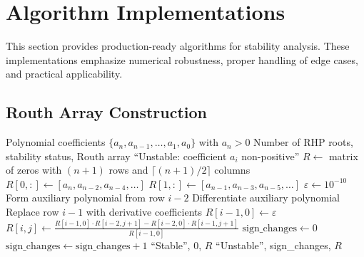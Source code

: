 \section{Algorithm Implementations}
\label{sec:stability_algorithms}

This section provides production-ready algorithms for stability analysis. These implementations emphasize numerical robustness, proper handling of edge cases, and practical applicability.

\subsection{Routh Array Construction}

\begin{algorithm}[H]
\caption{Routh-Hurwitz Stability Analysis}
\label{alg:routh}
\begin{algorithmic}[1]
\REQUIRE Polynomial coefficients $\{a_n, a_{n-1}, \ldots, a_1, a_0\}$ with $a_n > 0$
\ENSURE Number of RHP roots, stability status, Routh array
\STATE
\STATE {}
        \RETURN ``Unstable: coefficient $a_i$ non-positive''
    \ENDIF
\ENDFOR
\STATE
\STATE {}
\STATE $R \gets$ matrix of zeros with $(n+1)$ rows and $\lceil(n+1)/2\rceil$ columns
\STATE $R[0, :] \gets [a_n, a_{n-2}, a_{n-4}, \ldots]$ 
\STATE $R[1, :] \gets [a_{n-1}, a_{n-3}, a_{n-5}, \ldots]$ 
\STATE
\STATE {}
    \STATE $\varepsilon \gets 10^{-10}$ 
            \STATE {}
            \STATE Form auxiliary polynomial from row $i-2$
            \STATE Differentiate auxiliary polynomial
            \STATE Replace row $i-1$ with derivative coefficients
        \ELSE
            \STATE $R[i-1, 0] \gets \varepsilon$ 
        \ENDIF
    \ENDIF
        \STATE $R[i, j] \gets \frac{R[i-1, 0] \cdot R[i-2, j+1] - R[i-2, 0] \cdot R[i-1, j+1]}{R[i-1, 0]}$
    \ENDFOR
\ENDFOR
\STATE
\STATE {}
\STATE $\text{sign\_changes} \gets 0$
        \STATE $\text{sign\_changes} \gets \text{sign\_changes} + 1$
    \ENDIF
\ENDFOR
\STATE
{}
    \RETURN ``Stable'', 0, $R$
\ELSE
    \RETURN ``Unstable'', sign\_changes, $R$
\ENDIF
\end{algorithmic}
\end{algorithm}

